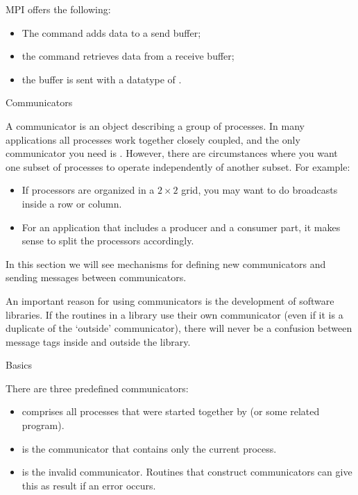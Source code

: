 MPI offers the following:
\begin{itemize}
\item The  command adds data to a send buffer;
\item the  command retrieves data from a receive buffer;
\item the buffer is sent with a datatype of .
\end{itemize}


 {Communicators}
\label{sec:communicators}

A communicator is an object describing a group of processes. In many 
applications all processes work together closely coupled, and the
only communicator you need is . However, there are 
circumstances where you want one subset of processes to operate 
independently of another subset. For example:
\begin{itemize}
\item If processors are organized in a $2\times2$ grid, you may want
  to do broadcasts inside a row or column. 
\item For an application that includes a producer and a consumer part,
  it makes sense to split the processors accordingly.
\end{itemize}
In this section we will see mechanisms for defining new communicators
and sending messages between communicators.

An important reason for using communicators is the development of
software libraries. If the routines in a library use their own communicator
(even if it is a duplicate of the `outside' communicator), there
will never be a confusion between message tags inside and outside the 
library.

 {Basics}

There are three predefined communicators:
\begin{itemize}
\item {} comprises all processes that were started 
  together by  (or some related program).
\item {} is the communicator that contains only
   the current process.
\item {} is the invalid communicator. Routines
  that construct communicators can give this as result if an error occurs.
\end{itemize}


